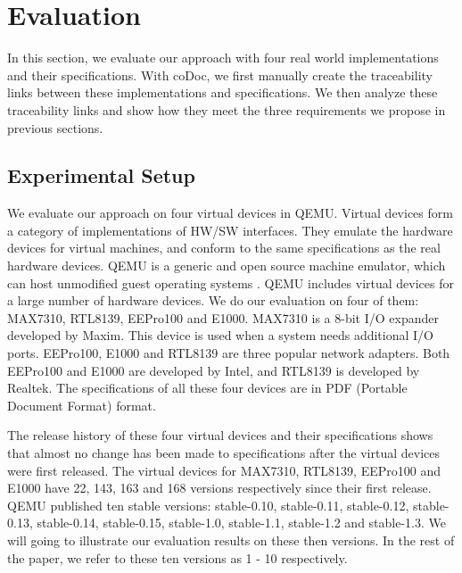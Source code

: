 
\section{Evaluation}
\label{sec:evaluation}

In this section, we evaluate our approach with four real world implementations and their specifications. With coDoc, we first manually create the traceability links between these implementations and specifications. We then analyze these traceability links and show how they meet the three requirements we propose in previous sections.

\subsection{Experimental Setup}
We evaluate our approach on four virtual devices in QEMU. Virtual devices form a category of implementations of HW/SW interfaces. They emulate the hardware devices for virtual machines, and conform to the same specifications as the real hardware devices. QEMU is a generic and open source machine emulator, which can host unmodified guest operating systems \cite{bellard_qemuwiki_2013} \cite{bellard_qemu_2005}. QEMU includes virtual devices for a large number of hardware devices. We do our evaluation on four of them: MAX7310, RTL8139, EEPro100 and E1000. MAX7310 is a 8-bit I/O expander developed by Maxim. This device is used when a system needs additional I/O ports. EEPro100, E1000 and RTL8139 are three popular network adapters. Both EEPro100 and E1000 are developed by Intel, and RTL8139 is developed by Realtek. The specifications of all these four devices are in PDF (Portable Document Format) format.

The release history of these four virtual devices and their specifications shows that almost no change has been made to specifications after the virtual devices were first released. The virtual devices for MAX7310, RTL8139, EEPro100 and E1000 have 22, 143, 163 and 168 versions respectively since their first release. QEMU published ten stable versions: stable-0.10, stable-0.11, stable-0.12, stable-0.13, stable-0.14, stable-0.15, stable-1.0, stable-1.1, stable-1.2 and stable-1.3. We will going to illustrate our evaluation results on these then versions. In the rest of the paper, we refer to these ten versions as 1 - 10 respectively.

